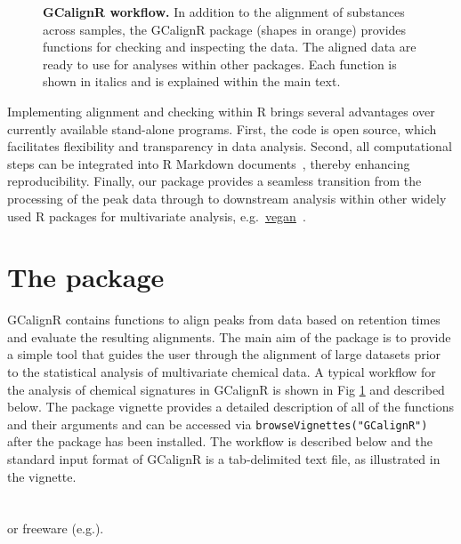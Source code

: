\documentclass[10pt,letterpaper]{article}
\begin{document}
\begin{figure}[htbp]
\centering
\caption{\textbf{GCalignR workflow.}
In addition to the alignment of substances across samples, the GCalignR package (shapes in orange) provides functions for checking and inspecting the data. The aligned data are ready to use for analyses within other packages. Each function is shown in italics and is explained within the main text.}
\label{Fig:Fig1}
\end{figure}

Implementing  alignment and checking within R brings several advantages over currently available stand-alone programs. First, the code is open source, which facilitates flexibility and transparency in data analysis. Second, all computational steps can be integrated into R Markdown documents~\cite{Allaire.2016}, thereby enhancing reproducibility. Finally, our package provides a seamless transition from the processing of the peak data through to downstream analysis within other widely used R packages for multivariate analysis, e.g.~\href{https://CRAN.R-project.org/package=vegan}{vegan}~\cite{Oksanen.2016}.

\section*{The package}
GCalignR contains functions to align peaks from   data based on retention times and evaluate the resulting alignments. The main aim of the package is to provide a simple tool that guides the user through the alignment of large datasets prior to the statistical analysis of multivariate chemical data.  A typical workflow for the analysis of chemical signatures in GCalignR is shown in Fig \ref{Fig:Fig1} and described below. The package vignette provides a detailed description of all of the functions and their arguments and can be accessed via \texttt{browseVignettes("GCalignR")} after the package has been installed. The workflow is described below and the standard input format of GCalignR is a tab-delimited text file, as illustrated in the vignette.

\section*{}
 or freeware (e.g.).
\end{document}
